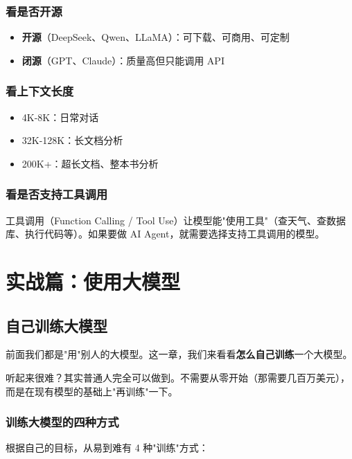 \documentclass[12pt,UTF8]{ctexbook}
\begin{document}
\section{看是否开源}

\begin{itemize}
  \item \textbf{开源}（DeepSeek、Qwen、LLaMA）：可下载、可商用、可定制
  \item \textbf{闭源}（GPT、Claude）：质量高但只能调用 API
\end{itemize}

\section{看上下文长度}

\begin{itemize}
  \item 4K-8K：日常对话
  \item 32K-128K：长文档分析
  \item 200K+：超长文档、整本书分析
\end{itemize}

\section{看是否支持工具调用}

工具调用（Function Calling / Tool Use）让模型能"使用工具"（查天气、查数据库、执行代码等）。如果要做 AI Agent，就需要选择支持工具调用的模型。


\part{实战篇：使用大模型}

\chapter{自己训练大模型}

前面我们都是"用"别人的大模型。这一章，我们来看看\textbf{怎么自己训练}一个大模型。

听起来很难？其实普通人完全可以做到。不需要从零开始（那需要几百万美元），而是在现有模型的基础上"再训练"一下。

\section{训练大模型的四种方式}

根据自己的目标，从易到难有 4 种"训练"方式：
\end{document}
